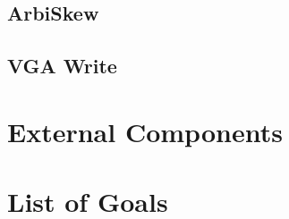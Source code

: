 \documentclass{article}
\begin{document}
\subsection{ArbiSkew}

\subsection{VGA Write}

\section{External Components}

\section{List of Goals}
\end{document}
